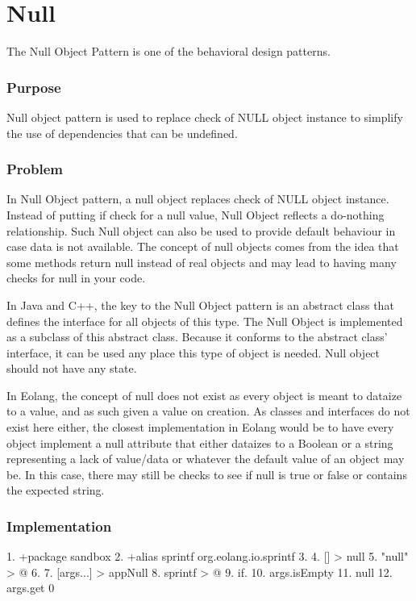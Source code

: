 \documentclass[12pt]{book}
\begin{document}
\section{Null}
The Null Object Pattern is one of the behavioral design patterns.

\subsubsection{Purpose}
Null object pattern is used to replace check of NULL object instance to simplify the use of dependencies that can be undefined.

\subsubsection{Problem}
In Null Object pattern, a null object replaces check of NULL object instance. Instead of putting if check for a null value, Null Object reflects a do-nothing relationship. Such Null object can also be used to provide default behaviour in case data is not available. The concept of null objects comes from the idea that some methods return null instead of real objects and may lead to having many checks for null in your code. 


In Java and C++, the key to the Null Object pattern is an abstract class that defines the interface for all objects of this type. The Null Object is implemented as a subclass of this abstract class. Because it conforms to the abstract class' interface, it can be used any place this type of object is needed. Null object should not have any state.


In Eolang, the concept of null does not exist as every object is meant to dataize to a value, and as such given a value on creation. As classes and interfaces do not exist here either, the closest implementation in Eolang would be to have every object implement a null attribute that either dataizes to a Boolean or a string representing a lack of value/data or whatever the default value of an object may be. In this case, there may still be checks to see if null is true or false or contains the expected string.

\subsubsection{Implementation}
\begin{ffcode}
1.	+package sandbox
2.	+alias sprintf org.eolang.io.sprintf
3.	
4.	[] > null
5.	  "null" > @
6.	
7.	[args...] > appNull
8.	  sprintf > @
9.	    if.
10.	      args.isEmpty
11.	      null
12.	      args.get 0 

\end{ffcode}
\end{document}
